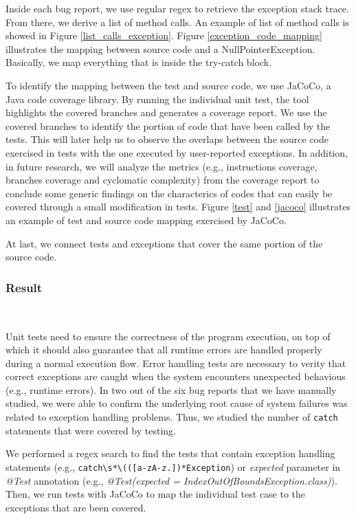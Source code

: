 		 Inside each bug report, we use regular regex to retrieve the exception stack trace. From there, we derive a list of method calls. An example of list of method calls is showed in Figure \ref{list_calls_exception}. Figure \ref{exception_code_mapping} illustrates the mapping between source code and a NullPointerException. Basically, we map everything that is inside the try-catch block.

		 To identify the mapping between the test and source code, we use JaCoCo, a Java code coverage library. By running the individual unit test, the tool highlights the covered branches and generates a coverage report. We use the covered branches to identify the portion of code that have been called by the tests. This will later help us to observe the overlaps between the source code exercised in tests with the one executed by user-reported exceptions. In addition, in future research, we will analyze the metrics (e.g., instructions coverage, branches coverage and cyclomatic complexity) from the coverage report to conclude some generic findings on the characterics of codes that can easily be covered through a small modification in tests. Figure \ref{test} and \ref{jacoco} illustrates an example of test and source code mapping exercised by JaCoCo.

		 At last, we connect tests and exceptions that cover the same portion of the source code. 
	~\\

	\subsubsection{Result}~

		Unit tests need to ensure the correctness of the program execution, on top of which it should also guarantee that all runtime errors are handled properly during a normal execution flow. Error handling tests are necessary to verity that correct exceptions are caught when the system encounters unexpected behavious (e.g., runtime errors). In two out of the six bug reports that we have manually studied, we were able to confirm the underlying root cause of system failures was related to exception handling problems. Thus, we studied the number of \verb/catch/ statements that were covered by testing.

		We performed a regex search to find the tests that contain exception handling statements (e.g., \verb/catch\s*\(([a-zA-z.])*Exception/) or \textit{expected} parameter in \textit{@Test} annotation (e.g., \textit{@Test(expected = IndexOutOfBoundsException.class)}). Then, we run tests with JaCoCo to map the individual test case to the exceptions that are been covered.

